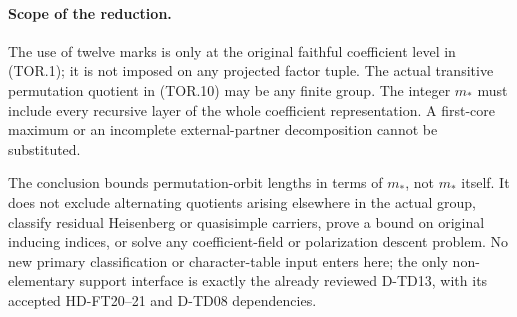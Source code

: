 \paragraph{Scope of the reduction.}
The use of twelve marks is only at the original faithful coefficient
level in (TOR.1); it is not imposed on any projected factor tuple.
The actual transitive permutation quotient in (TOR.10) may be any
finite group. The integer \(m_*\) must include every recursive layer
of the whole coefficient representation. A first-core maximum or an
incomplete external-partner decomposition cannot be substituted.

The conclusion bounds permutation-orbit lengths in terms of \(m_*\),
not \(m_*\) itself. It does not exclude alternating quotients arising
elsewhere in the actual group, classify residual Heisenberg or
quasisimple carriers, prove a bound on original inducing indices,
or solve any coefficient-field or polarization descent problem.
No new primary classification or character-table input enters here;
the only non-elementary support interface is exactly the already
reviewed D-TD13, with its accepted HD-FT20--21 and D-TD08 dependencies.
